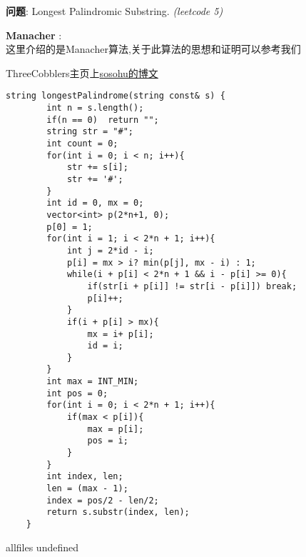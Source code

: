 \documentclass{article}
\begin{document}
\begin{CJK}{UTF8}{gbsn}     %

\else
    
\begin{description}
    \item{\textbf{问题}}: Longest Palindromic Substring. \textit{(leetcode 5)}
    \item{\textbf{Manacher}} : 
    \\这里介绍的是Manacher算法,关于此算法的思想和证明可以参考我们

	ThreeCobblers主页上\href{https://github.com/ThreeCobblers/Paladin/blob/master/blog/string/LongestPalindrome.md}{sosohu的博文}
    \begin{lstlisting}
string longestPalindrome(string const& s) {
        int n = s.length();
        if(n == 0)  return "";
        string str = "#";
        int count = 0;
        for(int i = 0; i < n; i++){
            str += s[i];
            str += '#';
        }
        int id = 0, mx = 0;
        vector<int> p(2*n+1, 0);
        p[0] = 1;
        for(int i = 1; i < 2*n + 1; i++){
            int j = 2*id - i;
            p[i] = mx > i? min(p[j], mx - i) : 1;
            while(i + p[i] < 2*n + 1 && i - p[i] >= 0){
                if(str[i + p[i]] != str[i - p[i]]) break;
                p[i]++;
            }
            if(i + p[i] > mx){
                mx = i+ p[i];
                id = i;
            }
        }
        int max = INT_MIN;
        int pos = 0;
        for(int i = 0; i < 2*n + 1; i++){
            if(max < p[i]){
                max = p[i];
                pos = i;
            }
        }
        int index, len;
        len = (max - 1);
        index = pos/2 - len/2;
        return s.substr(index, len);
    }
    \end{lstlisting}
\end{description}

\fi

\ifx allfiles undefined
\end{CJK}
\end{document}
